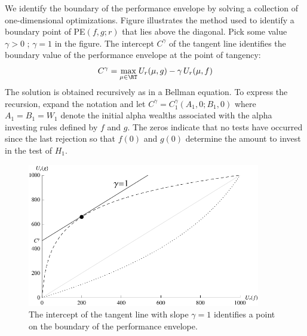 \documentclass[12pt]{article}
\begin{document}
 We identify the boundary of the performance envelope by solving a collection of
 one-dimensional optimizations.  Figure  illustrates the method
 used to identify a boundary point of PE$(f,g; r)$ that lies above the diagonal.
  Pick some value $\gamma > 0$ \marginpar{$\gamma$}; $\gamma = 1$ in the figure.
  The intercept $C^\gamma$ of the tangent line identifies the boundary value of
 the performance envelope at the point of tangency:
 \begin{equation}
     C^\gamma = \max_{\mu \in \RT} U_r(\mu,g) - \gamma \, U_r(\mu,f) 
 \label{eq:opt}
 \end{equation}
 The solution is obtained recursively as in a Bellman equation.  To express the
 recursion, expand the notation and let $C^\gamma = C_1^\gamma(A_1,0;B_1,0)$
 where $A_1=B_1=W_1$ denote the initial alpha wealths associated with the alpha
 investing rules defined by $f$ and $g$. The zeros indicate that no tests have
 occurred since the last rejection so that $f(0)$ and $g(0)$ determine the amount
 to invest in the test of $H_1$.


 \begin{figure}
 \caption{ \label{fi:tangent} The intercept of the tangent line with slope
 $\gamma = 1$ identifies a point on the boundary of the performance envelope. }
 \centerline{ \includegraphics[width=4in]{tangent} }
 \end{figure}
\end{document}
